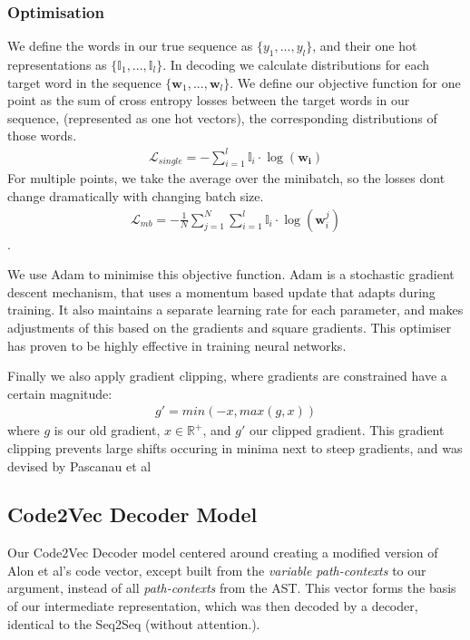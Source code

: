 \subsubsection{Optimisation}

We define the words in our true sequence as $\{y_1, ..., y_l\}$, and their one hot representations as $\{\mathbb{I}_1, ...,\mathbb{I}_l \}$.
In decoding we calculate distributions for each target word in the sequence $\{\mathbf{w}_1, ..., \mathbf{w}_l\}$.
We define our objective function for one point as the sum of cross entropy losses between the target words in our sequence, (represented as one hot vectors), the corresponding distributions of those words.
\begin{align}
    \mathcal{L}_{single} = -\sum_{i=1}^l\mathbb{I}_i\cdotp\log(\mathbf{w_i})
\end{align} 
For multiple points, we take the average over the minibatch, so the losses dont change dramatically with changing batch size.
\begin{align}
    \mathcal{L}_{mb} = -\frac{1}{N}\sum_{j=1}^N\sum_{i=1}^l\mathbb{I}_i\cdotp\log(\mathbf{w}_i^j)
\end{align}.

We use Adam \cite{kingma2014adam} to minimise this objective function. Adam is a stochastic gradient descent mechanism, that uses a momentum based update that adapts during training. It also maintains a separate learning rate for each parameter, and makes adjustments of this based on the gradients and square gradients. This optimiser has proven to be highly effective in training neural networks\cite{ruder_overview_2016}.

Finally we also apply gradient clipping, where gradients are constrained have a certain magnitude:
\begin{align}
     g' = min(-x,max(g, x))
\end{align}
where $g$ is our old gradient, $x \in \mathbb{R}^{+}$, and $g'$ our clipped gradient. This gradient clipping prevents large shifts occuring in minima next to steep gradients, and was devised by Pascanau et al\cite{pascanu_difficulty_2012}

\subsection{Code2Vec Decoder Model} %
\label{sec:code2vec_decoder_model}

Our Code2Vec Decoder model centered around creating a modified version of Alon et al's \cite{alon_code2vec_2018} code vector, except built from the \textit{variable path-contexts} to our argument, instead of all \textit{path-contexts} from the AST.
This vector forms the basis of our intermediate representation, which was then decoded by a decoder, identical to the Seq2Seq (without attention.).

